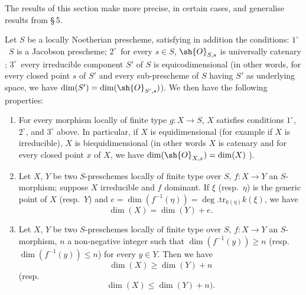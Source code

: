 The results of this section make more precise, in certain cases, and generalise results from \S\,5.

\begin{proposition}[10.6.1]
\label{IV.10.6.1}
Let $S$ be a locally Noetherian prescheme, satisfying in addition the conditions: $1^\circ$~$S$ is a Jacobson prescheme; $2^\circ$~for every $s\in S$, $\sh{O}_{S,s}$ is universally catenary ; $3^\circ$~every irreducible component $S'$ of $S$ is equicodimensional (in other words, for every closed point $s$ of $S'$ and every sub-prescheme of $S$ having $S'$ as underlying space, we have $\dim(S')=\dim(\sh{O}_{S',s})$).
We then have the following properties:
\begin{enumerate}[label=(\roman*)]
  \item For every morphism locally of finite type $g:X\to S$, $X$ satisfies conditions $1^\circ$, $2^\circ$, and $3^\circ$ above.
In particular, if $X$ is equidimensional (for example if $X$ is irreducible), $X$ is biequidimensional (in other words $X$ is catenary and for every closed point $x$ of $X$, we have $\dim(\sh{O}_{X,x})=\dim(X)$ ).
  \item Let $X$, $Y$ be two $S$-preschemes locally of finite type over $S$, $f:X\to Y$ an $S$-morphism; suppose $X$ irreducible and $f$ dominant.
If $\xi$ (resp.\ $\eta$) is the generic point of $X$ (resp.\ $Y$) and $e=\dim(f^{-1}(\eta))=\deg.\mathrm{tr}_{k(\eta)}k(\xi)$, we have
\begin{equation}
\label{IV.10.6.1.1}
\tag{10.6.1.1}
\dim(X)=\dim(Y)+e.
\end{equation}
  \item Let $X$, $Y$ be two $S$-preschemes locally of finite type over $S$, $f:X\to Y$ an $S$-morphism, $n$ a non-negative integer such that $\dim(f^{-1}(y))\geq n$ (resp.\ $\dim(f^{-1}(y))\leq n$) for every $y\in Y$.
Then we have
\begin{equation}
\label{IV.10.6.1.2}
\tag{10.6.1.2}
\dim(X)\geq\dim(Y)+n
\end{equation}
(resp.
\begin{equation}
\label{IV.10.6.1.3}
\tag{10.6.1.3}
\dim(X)\leq\dim(Y)+n).
\end{equation}
\end{enumerate}
\end{proposition}

